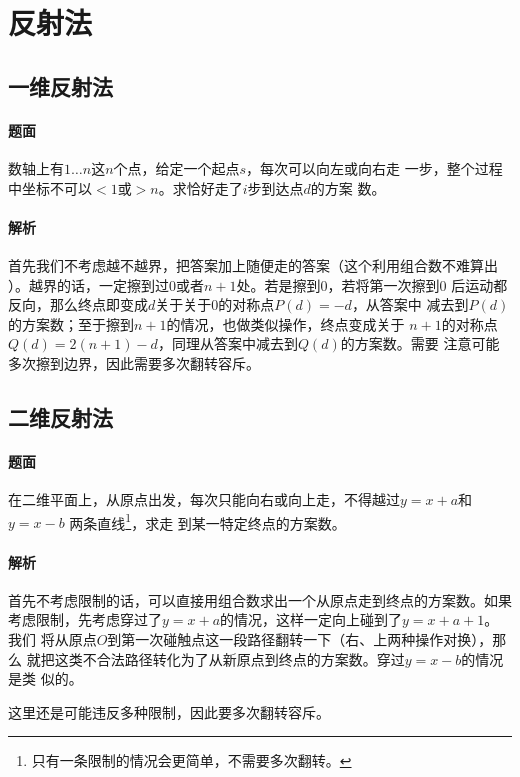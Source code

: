 \section{反射法}
\subsection{一维反射法}
\paragraph{题面}
数轴上有$1\ldots n$这$n$个点，给定一个起点$s$，每次可以向左或向右走
一步，整个过程中坐标不可以$<1$或$>n$。求恰好走了$i$步到达点$d$的方案
数。
\paragraph{解析}
首先我们不考虑越不越界，把答案加上随便走的答案（这个利用组合数不难算出
）。越界的话，一定擦到过$0$或者$n+1$处。若是擦到$0$，若将第一次擦到$0$
后运动都反向，那么终点即变成$d$关于关于$0$的对称点$P(d)=-d$，从答案中
减去到$P(d)$的方案数；至于擦到$n+1$的情况，也做类似操作，终点变成关于
$n+1$的对称点$Q(d)=2(n+1)-d$，同理从答案中减去到$Q(d)$的方案数。需要
注意可能多次擦到边界，因此需要多次翻转容斥。

\subsection{二维反射法}
\paragraph{题面}
在二维平面上，从原点出发，每次只能向右或向上走，不得越过$y=x+a$和$y=x-b$
两条直线\footnote{只有一条限制的情况会更简单，不需要多次翻转。}，求走
到某一特定终点的方案数。
\paragraph{解析}
首先不考虑限制的话，可以直接用组合数求出一个从原点走到终点的方案数。如果
考虑限制，先考虑穿过了$y=x+a$的情况，这样一定向上碰到了$y=x+a+1$。我们
将从原点$O$到第一次碰触点这一段路径翻转一下（右、上两种操作对换），那么
就把这类不合法路径转化为了从新原点到终点的方案数。穿过$y=x-b$的情况是类
似的。\par
这里还是可能违反多种限制，因此要多次翻转容斥。